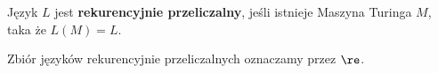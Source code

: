 
\begin{definition}
    Język \( L \) jest \textbf{rekurencyjnie przeliczalny}, jeśli istnieje Maszyna Turinga \( M \), taka że \( L(M) = L \).
    
    Zbiór języków rekurencyjnie przeliczalnych oznaczamy przez \( \re \).
\end{definition}
